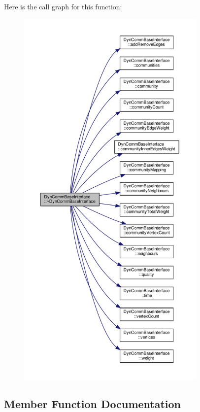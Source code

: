 Here is the call graph for this function\+:
\nopagebreak
\begin{figure}[H]
\begin{center}
\leavevmode
\includegraphics[height=550pt]{classDynCommBaseInterface_a1bc41ad0bdef6a4d8370ba640a271b33_cgraph}
\end{center}
\end{figure}


\subsection{Member Function Documentation}
\mbox{\label{classDynCommBaseInterface_a08720be341a0e75c3535749219f7377b}} 
